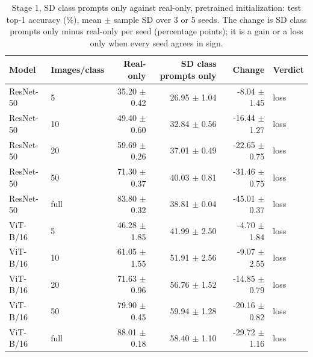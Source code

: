 \begin{table}[H]
\centering
\caption{Stage 1, SD class prompts only against real-only, pretrained initialization: test top-1 accuracy (\%), mean $\pm$ sample SD over 3 or 5 seeds. The change is SD class prompts only minus real-only per seed (percentage points); it is a gain or a loss only when every seed agrees in sign.}
\label{tab:stage1-pretrained-accuracy-sd_prompt_only-test}
\begin{tabular}{llrrrl}
\toprule
Model & Images/class & Real-only & SD class prompts only & Change & Verdict \\
\midrule
ResNet-50 & 5 & 35.20 $\pm$ 0.42 & 26.95 $\pm$ 1.04 & -8.04 $\pm$ 1.45 & loss \\
ResNet-50 & 10 & 49.40 $\pm$ 0.60 & 32.84 $\pm$ 0.56 & -16.44 $\pm$ 1.27 & loss \\
ResNet-50 & 20 & 59.69 $\pm$ 0.26 & 37.01 $\pm$ 0.49 & -22.65 $\pm$ 0.75 & loss \\
ResNet-50 & 50 & 71.30 $\pm$ 0.37 & 40.03 $\pm$ 0.81 & -31.46 $\pm$ 0.75 & loss \\
ResNet-50 & full & 83.80 $\pm$ 0.32 & 38.81 $\pm$ 0.04 & -45.01 $\pm$ 0.37 & loss \\
\midrule
ViT-B/16 & 5 & 46.28 $\pm$ 1.85 & 41.99 $\pm$ 2.50 & -4.70 $\pm$ 1.84 & loss \\
ViT-B/16 & 10 & 61.05 $\pm$ 1.55 & 51.91 $\pm$ 2.56 & -9.07 $\pm$ 2.55 & loss \\
ViT-B/16 & 20 & 71.63 $\pm$ 0.96 & 56.76 $\pm$ 1.52 & -14.85 $\pm$ 0.79 & loss \\
ViT-B/16 & 50 & 79.90 $\pm$ 0.45 & 59.94 $\pm$ 1.28 & -20.16 $\pm$ 0.82 & loss \\
ViT-B/16 & full & 88.01 $\pm$ 0.18 & 58.40 $\pm$ 1.10 & -29.72 $\pm$ 1.16 & loss \\
\bottomrule
\end{tabular}
\end{table}
